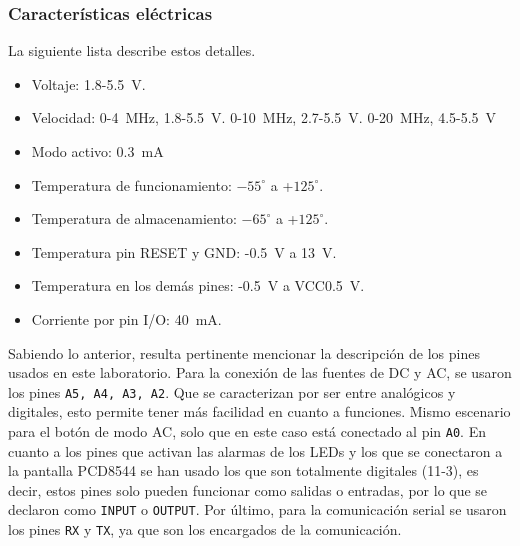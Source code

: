 \subsubsection*{Características eléctricas}
La siguiente lista describe estos detalles.
\begin{itemize}
\item Voltaje: 1.8-\SI{5.5}{\volt}.
\item Velocidad: 0-\SI{4}{\mega\Hz},  1.8-\SI{5.5}{\volt}. 0-\SI{10}{\mega\Hz},  2.7-\SI{5.5}{\volt}. 0-\SI{20}{\mega\Hz},  4.5-\SI{5.5}{\volt}
\item Modo activo: \SI{0.3}{\mA}
\item Temperatura de funcionamiento: $-55^\circ$ a +$125^\circ$.
\item Temperatura de almacenamiento: $-65^\circ$ a +$125^\circ$.
\item Temperatura pin RESET y GND: -\SI{0.5}{\volt} a \SI{13}{\volt}.
\item Temperatura en los demás pines: -\SI{0.5}{\volt} a VCC\SI{0.5}{\volt}.
\item Corriente por pin I/O: \SI{40}{\mA}.
\end{itemize}
Sabiendo lo anterior, resulta pertinente mencionar la descripción de los pines usados en este laboratorio. Para la conexión de las fuentes de DC y AC, se usaron los pines \texttt{A5, A4, A3, A2}. Que se caracterizan por ser entre analógicos y digitales, esto permite tener más facilidad en cuanto a funciones. Mismo escenario para el botón de modo AC, solo que en este caso está conectado al pin \texttt{A0}. En cuanto a los pines que activan las alarmas de los LEDs y los que se conectaron a la pantalla PCD8544 se han usado los que son totalmente digitales (11-3), es decir, estos pines solo pueden funcionar como salidas o entradas, por lo que se declaron como \texttt{INPUT} o \texttt{OUTPUT}. Por último, para la comunicación serial se usaron los pines \texttt{RX} y \texttt{TX}, ya que son los encargados de la comunicación.
